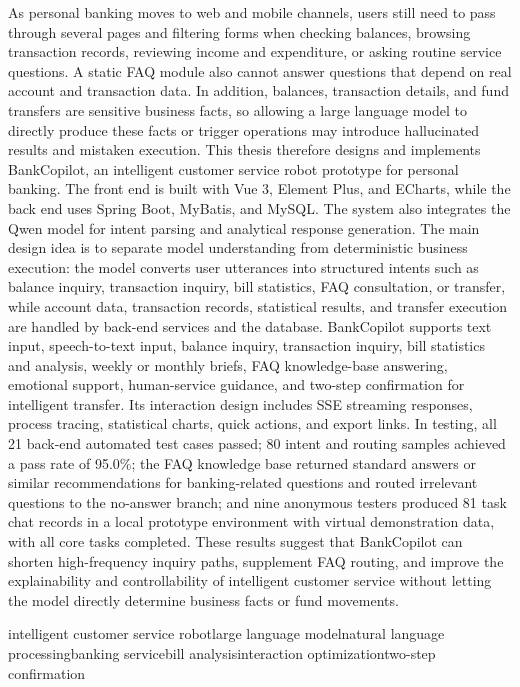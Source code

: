 \documentclass[bachelor, print]{xduthesis}
\begin{document}
\begin{eabstract}
As personal banking moves to web and mobile channels, users still need to pass through several pages and filtering forms when checking balances, browsing transaction records, reviewing income and expenditure, or asking routine service questions. A static FAQ module also cannot answer questions that depend on real account and transaction data. In addition, balances, transaction details, and fund transfers are sensitive business facts, so allowing a large language model to directly produce these facts or trigger operations may introduce hallucinated results and mistaken execution. This thesis therefore designs and implements BankCopilot, an intelligent customer service robot prototype for personal banking. The front end is built with Vue 3, Element Plus, and ECharts, while the back end uses Spring Boot, MyBatis, and MySQL. The system also integrates the Qwen model for intent parsing and analytical response generation. The main design idea is to separate model understanding from deterministic business execution: the model converts user utterances into structured intents such as balance inquiry, transaction inquiry, bill statistics, FAQ consultation, or transfer, while account data, transaction records, statistical results, and transfer execution are handled by back-end services and the database. BankCopilot supports text input, speech-to-text input, balance inquiry, transaction inquiry, bill statistics and analysis, weekly or monthly briefs, FAQ knowledge-base answering, emotional support, human-service guidance, and two-step confirmation for intelligent transfer. Its interaction design includes SSE streaming responses, process tracing, statistical charts, quick actions, and export links. In testing, all 21 back-end automated test cases passed; 80 intent and routing samples achieved a pass rate of 95.0\%; the FAQ knowledge base returned standard answers or similar recommendations for banking-related questions and routed irrelevant questions to the no-answer branch; and nine anonymous testers produced 81 task chat records in a local prototype environment with virtual demonstration data, with all core tasks completed. These results suggest that BankCopilot can shorten high-frequency inquiry paths, supplement FAQ routing, and improve the explainability and controllability of intelligent customer service without letting the model directly determine business facts or fund movements.
\end{eabstract}

\begin{ekeywords}
intelligent customer service robot\quad large language model\quad natural language processing\quad banking service\quad bill analysis\quad interaction optimization\quad two-step confirmation
\end{ekeywords}
\end{document}
